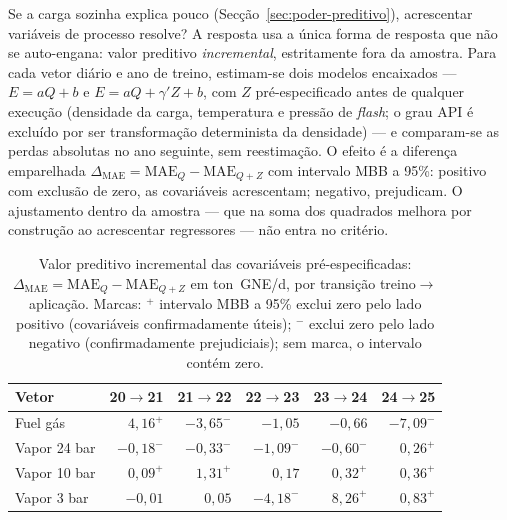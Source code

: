 
Se a carga sozinha explica pouco (Secção~\ref{sec:poder-preditivo}), acrescentar
variáveis de processo resolve? A resposta usa a única forma de
resposta que não se auto-engana: valor preditivo \emph{incremental},
estritamente fora da amostra. Para cada vetor diário e ano de treino,
estimam-se dois modelos encaixados --- $E = aQ + b$ e $E = aQ + \gamma'Z + b$,
com $Z$ pré-especificado antes de qualquer execução (densidade da carga,
temperatura e pressão de \emph{flash}; o grau API é excluído por ser
transformação determinista da densidade) --- e comparam-se as perdas absolutas
no ano seguinte, sem reestimação. O efeito é a diferença emparelhada
$\Delta_{\mathrm{MAE}} = \mathrm{MAE}_{Q} - \mathrm{MAE}_{Q+Z}$ com intervalo
MBB a 95\%: positivo com exclusão de zero, as covariáveis acrescentam;
negativo, prejudicam. O ajustamento dentro da amostra --- que na soma dos
quadrados melhora por construção ao acrescentar regressores --- não entra no
critério.

\begin{table}[htbp]
  \centering
  \caption[Valor incremental das covariáveis]{Valor preditivo
  incremental das covariáveis pré-especificadas:
  $\Delta_{\mathrm{MAE}} = \mathrm{MAE}_{Q} - \mathrm{MAE}_{Q+Z}$ em
  ton~GNE/d, por transição treino${\to}$aplicação. Marcas: $^{+}$ intervalo
  MBB a 95\% exclui zero pelo lado positivo (covariáveis confirmadamente
  úteis); $^{-}$ exclui zero pelo lado negativo (confirmadamente
  prejudiciais); sem marca, o intervalo contém zero.}
  \label{tab:covariaveis-incremental}
  \begin{tabular}{lrrrrr}
    \toprule
    Vetor & \multicolumn{1}{c}{20${\to}$21} & \multicolumn{1}{c}{21${\to}$22}
    & \multicolumn{1}{c}{22${\to}$23} & \multicolumn{1}{c}{23${\to}$24}
    & \multicolumn{1}{c}{24${\to}$25} \\
    \midrule
    Fuel gás     & $4{,}16^{+}$  & $-3{,}65^{-}$ & $-1{,}05$      & $-0{,}66$     & $-7{,}09^{-}$ \\
    Vapor 24 bar & $-0{,}18^{-}$ & $-0{,}33^{-}$ & $-1{,}09^{-}$  & $-0{,}60^{-}$ & $0{,}26^{+}$  \\
    Vapor 10 bar & $0{,}09^{+}$  & $1{,}31^{+}$  & $0{,}17$       & $0{,}32^{+}$  & $0{,}36^{+}$  \\
    Vapor 3 bar  & $-0{,}01$     & $0{,}05$      & $-4{,}18^{-}$  & $8{,}26^{+}$  & $0{,}83^{+}$  \\
    \bottomrule
  \end{tabular}
\end{table}

